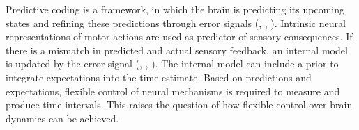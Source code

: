 \documentclass[10pt]{article}
\begin{document}
Predictive coding is a framework, in which the brain is predicting its upcoming states and refining these predictions through error signals (\cite{Rao1999}, \cite{Huang2011}, \cite{Ficco2021}).
Intrinsic neural representations of motor actions are used as predictor of sensory consequences. %
If there is a mismatch in predicted and actual sensory feedback, an internal model is updated by the error signal (\cite{Straka2018}, \cite{Clark2013}, \cite{Bubic2010}). %
The internal model can include a prior to integrate expectations into the time estimate.
Based on predictions and expectations, flexible control of neural mechanisms is required to measure and produce time intervals.
This raises the question of how flexible control over brain dynamics can be achieved.

\end{document}
